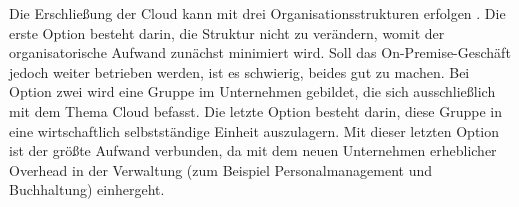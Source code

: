 Die Erschließung der Cloud kann mit drei Organisationsstrukturen erfolgen 
. Die erste Option besteht darin, 
die Struktur nicht zu verändern, womit der organisatorische Aufwand zunächst 
minimiert wird. Soll das On-Premise-Geschäft jedoch weiter betrieben werden, 
ist es schwierig, beides gut zu machen. Bei Option zwei wird eine Gruppe im 
Unternehmen gebildet, die sich ausschließlich mit dem Thema Cloud befasst. Die 
letzte Option besteht darin, diese Gruppe in eine wirtschaftlich selbstständige 
Einheit auszulagern. Mit dieser letzten Option ist der größte Aufwand 
verbunden, da mit dem neuen Unternehmen erheblicher Overhead in der Verwaltung 
(zum Beispiel Personalmanagement und Buchhaltung) einhergeht.

